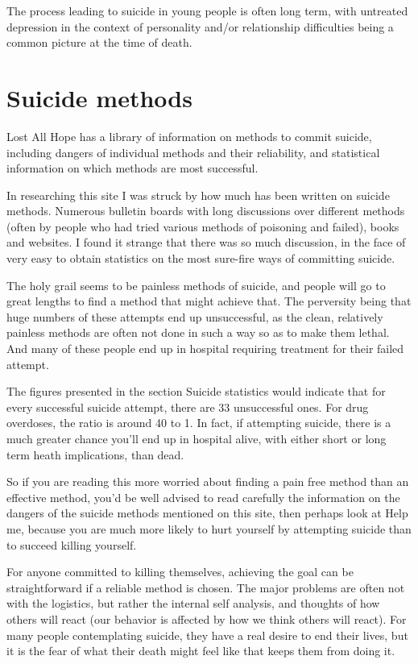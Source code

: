 \documentclass[12pt]{article}
\begin{document}
The process leading to suicide in young people is often long term, with untreated depression in the context of personality and/or relationship difficulties being a common picture at the time of death.

\section{Suicide methods}

Lost All Hope has a library of information on methods to commit suicide, including dangers of individual methods and their reliability, and statistical information on which methods are most successful.

In researching this site I was struck by how much has been written on suicide methods. Numerous bulletin boards with long discussions over different methods (often by people who had tried various methods of poisoning and failed), books and websites. I found it strange that there was so much discussion, in the face of very easy to obtain statistics on the most sure-fire ways of committing suicide.

The holy grail seems to be painless methods of suicide, and people will go to great lengths to find a method that might achieve that. The perversity being that huge numbers of these attempts end up unsuccessful, as the clean, relatively painless methods are often not done in such a way so as to make them lethal. And many of these people end up in hospital requiring treatment for their failed attempt.

The figures presented in the section Suicide statistics would indicate that for every successful suicide attempt, there are 33 unsuccessful ones. For drug overdoses, the ratio is around 40 to 1. In fact, if attempting suicide, there is a much greater chance you'll end up in hospital alive, with either short or long term heath implications, than dead.

So if you are reading this more worried about finding a pain free method than an effective method, you'd be well advised to read carefully the information on the dangers of the suicide methods mentioned on this site, then perhaps look at Help me, because you are much more likely to hurt yourself by attempting suicide than to succeed killing yourself.

For anyone committed to killing themselves, achieving the goal can be straightforward if a reliable method is chosen. The major problems are often not with the logistics, but rather the internal self analysis, and thoughts of how others will react (our behavior is affected by how we think others will react). For many people contemplating suicide, they have a real desire to end their lives, but it is the fear of what their death might feel like that keeps them from doing it.
\end{document}
